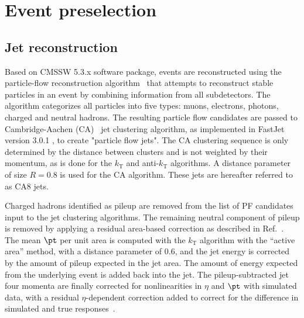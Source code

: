 \section{Event preselection}
\label{sec:analysis}

\subsection{Jet reconstruction}

\label{sec:reconstruction}


Based on CMSSW 5.3.x software package, 
events are reconstructed using the particle-flow reconstruction
algorithm~\cite{particleflow} that attempts to reconstruct 
stable particles in an event by combining information from all
subdetectors. The algorithm categorizes all particles into five types:
muons, electrons, photons, charged and neutral hadrons. The resulting
particle flow candidates are passed to 
Cambridge-Aachen (CA)~\cite{CAaachen,CAcambridge}
jet clustering algorithm, as implemented in FastJet version 3.0.1 \cite{fastjet1,fastjet},
to create "particle flow jets".
The CA clustering sequence is only determined by the distance between
clusters and is not weighted by their momentum, as is done for the
$k_\text{T}$ and anti-$k_\text{T}$ algorithms. A distance parameter of
size $R=0.8$ is used for the CA algorithm.  These jets are hereafter referred
to as CA8 jets.


Charged hadrons identified as pileup are removed from the list of 
PF candidates input to
the jet clustering algorithms.  The remaining neutral component of pileup
is removed by applying a residual area-based correction as
described in Ref.~\cite{jetarea_fastjet,jetarea_fastjet_pu}.  The mean
$\pt$ per unit area is computed with the $k_{\mathrm T}$ algorithm
with the ``active area'' method, with a distance parameter of 0.6, and
the jet energy is corrected by the amount of pileup expected in the
jet area. The amount of energy expected from the underlying event is
added back into the jet.  The pileup-subtracted jet four momenta are
finally corrected for nonlinearities in $\eta$ and $\pt$ with
simulated data, with a residual $\eta$-dependent correction added to
correct for the difference in simulated and true
responses~\cite{JME-JINST,Collaboration:2012dp}.

